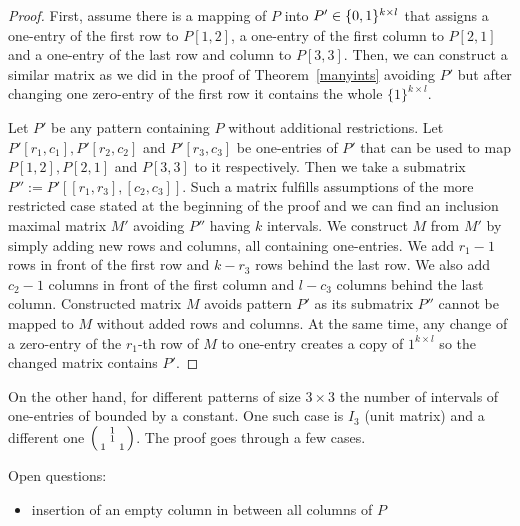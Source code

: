 \begin{proof}
First, assume there is a mapping of $P$ into $P'\in\{0,1\}^{k\times l}$ that assigns a one-entry of the first row to $P[1,2]$, a one-entry of the first column to $P[2,1]$ and a one-entry of the last row and column to $P[3,3]$. Then, we can construct a similar matrix as we did in the proof of Theorem~\ref{manyints} avoiding $P'$ but after changing one zero-entry of the first row it contains the whole $\{1\}^{k\times l}$.

Let $P'$ be any pattern containing $P$ without additional restrictions. Let $P'[r_1,c_1],P'[r_2,c_2]$ and $P'[r_3,c_3]$ be one-entries of $P'$ that can be used to map $P[1,2],P[2,1]$ and $P[3,3]$ to it respectively. Then we take a submatrix $P'':=P'[[r_1,r_3],[c_2,c_3]]$. Such a matrix fulfills assumptions of the more restricted case stated at the beginning of the proof and we can find an inclusion maximal matrix $M'$ avoiding $P''$ having $k$ intervals. We construct $M$ from $M'$ by simply adding new rows and columns, all containing one-entries. We add $r_1-1$ rows in front of the first row and $k-r_3$ rows behind the last row. We also add $c_2-1$ columns in front of the first column and $l-c_3$ columns behind the last column. Constructed matrix $M$ avoids pattern $P'$ as its submatrix $P''$ cannot be mapped to $M$ without added rows and columns. At the same time, any change of a zero-entry of the $r_1$-th row of $M$ to one-entry creates a copy of ${1}^{k\times l}$ so the changed matrix contains $P'$.
\end{proof}
On the other hand, for different patterns of size $3\times3$ the number of intervals of one-entries of bounded by a constant. One such case is $I_3$ (unit matrix) and a different one $\left(\begin{smallmatrix} &1& \\ &1& \\1& &1\end{smallmatrix}\right)$. The proof goes through a few cases.

Open questions:
\begin{itemize}
\item insertion of an empty column in between all columns of $P$
\end{itemize}


